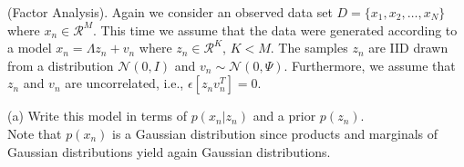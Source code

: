 \documentclass[a4paper]{article}
\newcommand{\mc}[1]{\mathcal{#1}}
\def\r#1{{\color{red}#1}}
\def\b#1{{\color{blue}#1}}
\begin{document}
\begin{ExerciseList}
%
%
%
%
%


\Exercise[label={ex:6}] (Factor Analysis).
Again we consider an observed data set $D = \{x_1,x_2,\ldots,x_N\}$ where $x_n \in \mc{R}^M$.  This time we assume that the data were generated according to a model $x_n = \Lambda z_n + v_n$ where $z_n \in \mc{R}^K$, $K<M$. The samples $z_n$ are IID drawn from a distribution $\mc{N}(0,I)$ and $v_n \sim \mc{N}(0,\Psi)$. Furthermore, we assume that $z_n$ and $v_n$ are uncorrelated, i.e., $\epsilon[z_nv_n^T]=0$.

\medskip
(a) Write this model in terms of $p(x_n|z_n)$ and a prior $p(z_n)$.\\

\medskip
Note that $p(x_n)$ is a Gaussian distribution since products and marginals of Gaussian distributions yield again Gaussian distributions.


\end{ExerciseList}
\end{document}
